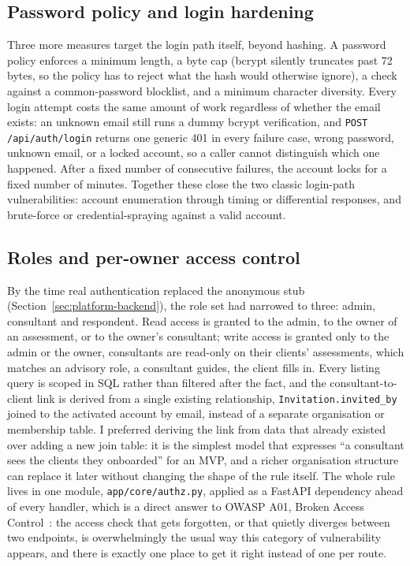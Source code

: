\subsection{Password policy and login hardening}

Three more measures target the login path itself, beyond hashing. A password policy enforces a minimum length, a byte cap (bcrypt silently truncates past 72 bytes, so the policy has to reject what the hash would otherwise ignore), a check against a common-password blocklist, and a minimum character diversity. Every login attempt costs the same amount of work regardless of whether the email exists: an unknown email still runs a dummy bcrypt verification, and \texttt{POST /\allowbreak api/\allowbreak auth/\allowbreak login} returns one generic 401 in every failure case, wrong password, unknown email, or a locked account, so a caller cannot distinguish which one happened. After a fixed number of consecutive failures, the account locks for a fixed number of minutes. Together these close the two classic login-path vulnerabilities: account enumeration through timing or differential responses, and brute-force or credential-spraying against a valid account.

\subsection{Roles and per-owner access control}

By the time real authentication replaced the anonymous stub (Section~\ref{sec:platform-backend}), the role set had narrowed to three: admin, consultant and respondent. Read access is granted to the admin, to the owner of an assessment, or to the owner's consultant; write access is granted only to the admin or the owner, consultants are read-only on their clients' assessments, which matches an advisory role, a consultant guides, the client fills in. Every listing query is scoped in SQL rather than filtered after the fact, and the consultant-to-client link is derived from a single existing relationship, \texttt{Invitation.\allowbreak invited\_\allowbreak by} joined to the activated account by email, instead of a separate organisation or membership table. I preferred deriving the link from data that already existed over adding a new join table: it is the simplest model that expresses ``a consultant sees the clients they onboarded'' for an MVP, and a richer organisation structure can replace it later without changing the shape of the rule itself. The whole rule lives in one module, \texttt{app/\allowbreak core/\allowbreak authz.\allowbreak py}, applied as a FastAPI dependency ahead of every handler, which is a direct answer to OWASP A01, Broken Access Control~\cite{owasp_top10_a01_2021}: the access check that gets forgotten, or that quietly diverges between two endpoints, is overwhelmingly the usual way this category of vulnerability appears, and there is exactly one place to get it right instead of one per route.

